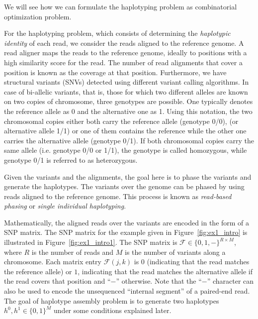 We will see how we can formulate the haplotyping problem as combinatorial optimization problem.

For the haplotyping problem, which consists of determining the \textit{haplotypic identity} of each read, we consider the reads aligned to the reference genome.
A read aligner maps the reads to the reference genome, ideally to positions with a high similarity score for the read. 
The number of read alignments that cover a position is known as the coverage at that position.
Furthermore, we have structural variants (SNVs) detected using different variant calling algorithms.
In case of bi-allelic variants, that is, those for which two different alleles are known on two copies of chromosome, three genotypes are possible.
One typically denotes the reference allele as 0 and the alternative one as 1. Using this
notation, the two chromosomal copies either both carry the reference allele (genotype
0/0), (or alternative allele 1/1) or one of them contains the reference while
the other one carries the alternative allele (genotype 0/1). If both chromosomal copies
carry the same allele (i.e. genotype 0/0 or 1/1), the genotype is called homozygous, while
genotype 0/1 is referred to as heterozygous.

Given the variants and the alignments, the goal here is to phase the variants and generate the haplotypes.
The variants over the genome can be phased by using reads aligned to the reference genome. This process is known as \textit{read-based phasing} or \textit{single individual haplotyping}.

Mathematically, the aligned reads over the variants are encoded in the form of a SNP matrix.
The SNP matrix for the example given in Figure~\ref{fig:ex1_intro} is illustrated in Figure~\ref{fig:ex1_intro1}.
The SNP matrix is $\mathcal{F}\in\{0,1,-\}^{R\times M}$, where $R$ is the number of reads and $M$ is the number of variants along a chromosome.
Each matrix entry $\mathcal{F}(j,k)$ is $0$ (indicating that the read matches the reference allele) or $1$, indicating that the read matches the alternative allele if the read covers that position and ``$-$'' otherwise.
Note that the ``$-$'' character can also be used to encode the unsequenced ``internal segment'' of a paired-end read.
The goal of haplotype assembly problem is to generate two haplotypes $h^0,h^1\in\{0,1\}^M$ under some conditions explained later.

